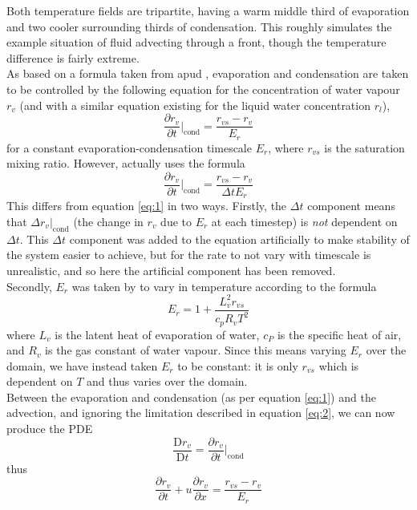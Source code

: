 \documentclass[11pt]{article}
\begin{document}
Both temperature fields are tripartite, having a warm middle third of evaporation and two cooler surrounding thirds of condensation. This roughly simulates the example situation of fluid advecting through a front, though the temperature difference is fairly extreme. \\
As based on a formula taken from \citet[p.~2920]{BF2002} apud \citet{RH1983}, evaporation and condensation are taken to be controlled by the following equation for the concentration of water vapour $r_v$ (and with a similar equation existing for the liquid water concentration $r_l$),
\begin{equation} \label{eq:1}
\frac{\partial r_v}{\partial t}|_{\text{cond}}=\frac{r_{vs} - r_v}{E_r}
\end{equation}
for a constant evaporation-condensation timescale $E_r$, where $r_{vs}$ is the saturation mixing ratio. However, \citeauthor{BF2002} actually uses the formula
\begin{equation}
\frac{\partial r_v}{\partial t}|_{\text{cond}}=\frac{r_{vs} - r_v}{\Delta t E_r}	\label{eq:artificial}
\end{equation}
This differs from equation \ref{eq:1} in two ways. Firstly, the $\Delta t$ component means that $\Delta r_v|_{\text{cond}}$ (the change in $r_v$ due to $E_r$ at each timestep) is \emph{not} dependent on $\Delta t$. This $\Delta t$ component was added to the equation artificially to make stability of the system easier to achieve, but for the rate to not vary with timescale is unrealistic, and so here the artificial component has been removed. \\
Secondly, $E_r$ was taken by \citeauthor{BF2002} to vary in temperature according to the formula
\begin{equation}
E_r = 1+\frac{L_v^2r_{vs}}{c_pR_vT^2} \label{eq:condrate}
\end{equation}
where $L_v$ is the latent heat of evaporation of water, $c_P$ is the specific heat of air, and $R_v$ is the gas constant of water vapour. Since this means varying $E_r$ over the domain, we have instead taken $E_r$ to be constant: it is only $r_{vs}$ which is dependent on $T$ and thus varies over the domain. \\
Between the evaporation and condensation (as per equation \ref{eq:1}) and the advection, and ignoring the limitation described in equation \ref{eq:2}, we can now produce the PDE
\[
\frac{\text{D} r_v}{\text{D} t}=\frac{\partial r_v}{\partial t}|_{\text{cond}}
\]
thus
\begin{equation}
\frac{\partial r_v}{\partial t}+u\frac{\partial r_v}{\partial x}=\frac{r_{vs} - r_v}{E_r} \label{eq:3}
\end{equation}
\end{document}
